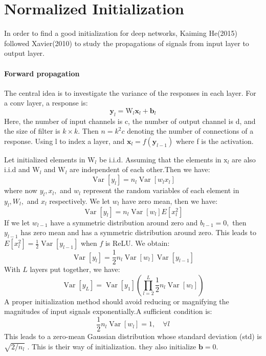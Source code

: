 \section{Normalized Initialization}
In order to find a good initialization for deep networks, Kaiming He(2015) followed Xavier(2010) to study the propagations of signals from input layer to output layer.
\paragraph{Forward propagation}
The central idea is to investigate the variance of the responses in each layer. For a conv layer, a response is:
$$
\mathbf{y}_{l}=\mathrm{W}_{l} \mathbf{x}_{l}+\mathbf{b}_{l}
$$
Here, the number of input channels is c, the number of output channel is d, and the size of filter is $k\times k$. Then $n=k^2c$ denoting the number of connections of a response. Using l to index a layer, and $ \mathbf{x}_{l} = f( \mathbf{y}_{l-1})$ where f is the activation.

Let initialized elements in $\mathrm{W}_{l}$ be i.i.d. Assuming that the elements in $\mathrm{x}_{l}$ are also i.i.d and $\mathrm{W}_{l}$ and $ \mathrm{W}_{l}$ are independent of each other.Then we have:
$$
\operatorname{Var}\left[y_{l}\right]=n_{l} \operatorname{Var}\left[w_{l} x_{l}\right]
$$
where now $y_{l}, x_{l},$ and $w_{l}$ represent the random variables of
each element in $y_{l}, W_{l},$ and $x_{l}$ respectively. We let $w_{l}$ have zero mean, then we have:
$$
\operatorname{Var}\left[y_{l}\right]=n_{l} \operatorname{Var}\left[w_{l}\right] E\left[x_{l}^{2}\right]
$$
If we let $w_{l-1}$ have a symmetric distribution around zero
and $b_{l-1}=0,$ then $y_{l-1}$ has zero mean and has a symmetric
distribution around zero. This leads to $E\left[x_{l}^{2}\right]=\frac{1}{2} \operatorname{Var}\left[y_{l-1}\right]$
when $f$ is ReLU. We obtain:
\begin{equation}
\operatorname{Var}\left[y_{l}\right]=\frac{1}{2} n_{l} \operatorname{Var}\left[w_{l}\right] \operatorname{Var}\left[y_{l-1}\right]
\end{equation}
With $L$ layers put together, we have:
$$
\operatorname{Var}\left[y_{L}\right]=\operatorname{Var}\left[y_{1}\right]\left(\prod_{l=2}^{L} \frac{1}{2} n_{l} \operatorname{Var}\left[w_{l}\right]\right)
$$
A proper initialization method should avoid reducing or magnifying the magnitudes of input signals exponentially.A sufficient condition is:
\begin{equation}\label{He}
\frac{1}{2} n_{l} \operatorname{Var}\left[w_{l}\right]=1, \quad \forall l
\end{equation}
This leads to a zero-mean Gaussian distribution whose standard deviation (std) is $\sqrt{2 / n_{l}}$ . This is their way of initialization. they also initialize $\mathbf{b}=0$.

